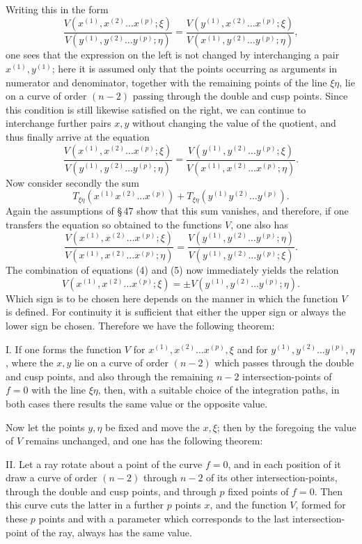 \documentclass[10pt]{article}
\begin{document}
Writing this in the form
\[
\frac{V(x^{(1)},x^{(2)}\ldots x^{(p)};\xi)}{V(y^{(1)},y^{(2)}\ldots y^{(p)};\eta)}
=\frac{V(y^{(1)},x^{(2)}\ldots x^{(p)};\xi)}{V(x^{(1)},y^{(2)}\ldots y^{(p)};\eta)},
\]
one sees that the expression on the left is not changed by interchanging a pair \(x^{(1)},y^{(1)}\); here it is assumed only that the points occurring as arguments in numerator and denominator, together with the remaining points of the line \(\xi\eta\), lie on a curve of order \((n-2)\) passing through the double and cusp points. Since this condition is still likewise satisfied on the right, we can continue to interchange further pairs \(x,y\) without changing the value of the quotient, and thus finally arrive at the equation
\[
\tag{4}\frac{V(x^{(1)},x^{(2)}\ldots x^{(p)};\xi)}{V(y^{(1)},y^{(2)}\ldots y^{(p)};\eta)}
=\frac{V(y^{(1)},y^{(2)}\ldots y^{(p)};\xi)}{V(x^{(1)},x^{(2)}\ldots x^{(p)};\eta)}.
\]
Now consider secondly the sum
\[
T_{\xi\eta}(x^{(1)}x^{(2)}\ldots x^{(p)})+T_{\xi\eta}(y^{(1)}y^{(2)}\ldots y^{(p)}).
\]
Again the assumptions of \S\,47 show that this sum vanishes, and therefore, if one transfers the equation so obtained to the functions \(V\), one also has
\[
\tag{5}\frac{V(x^{(1)},x^{(2)}\ldots x^{(p)};\xi)}{V(x^{(1)},x^{(2)}\ldots x^{(p)};\eta)}
=\frac{V(y^{(1)},y^{(2)}\ldots y^{(p)};\eta)}{V(y^{(1)},y^{(2)}\ldots y^{(p)};\xi)}.
\]
The combination of equations (4) and (5) now immediately yields the relation
\[
V(x^{(1)},x^{(2)}\ldots x^{(p)};\xi)=\pm V(y^{(1)},y^{(2)}\ldots y^{(p)};\eta).
\]
Which sign is to be chosen here depends on the manner in which the function \(V\) is defined. For continuity it is sufficient that either the upper sign or always the lower sign be chosen. Therefore we have the following theorem:

I. If one forms the function \(V\) for \(x^{(1)},x^{(2)}\ldots x^{(p)},\xi\) and for \(y^{(1)},y^{(2)}\ldots y^{(p)},\eta\), where the \(x,y\) lie on a curve of order \((n-2)\) which passes through the double and cusp points, and also through the remaining \(n-2\) intersection-points of \(f=0\) with the line \(\xi\eta\), then, with a suitable choice of the integration paths, in both cases there results the same value or the opposite value.

Now let the points \(y,\eta\) be fixed and move the \(x,\xi\); then by the foregoing the value of \(V\) remains unchanged, and one has the following theorem:

II. Let a ray rotate about a point of the curve \(f=0\), and in each position of it draw a curve of order \((n-2)\) through \(n-2\) of its other intersection-points, through the double and cusp points, and through \(p\) fixed points of \(f=0\). Then this curve cuts the latter in a further \(p\) points \(x\), and the function \(V\), formed for these \(p\) points and with a parameter which corresponds to the last intersection-point of the ray, always has the same value.
\end{document}
